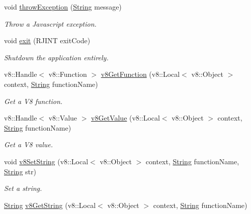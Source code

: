 \begin{DoxyCompactItemize}
void \mbox{\hyperlink{class_rad_j_a_v_1_1_v8_javascript_engine_a08ad9464e2efe78b0c84d32728b12632}{throw\+Exception}} (\mbox{\hyperlink{class_rad_j_a_v_1_1_string}{String}} message)
\begin{DoxyCompactList}\small\item\em Throw a Javascript exception. \end{DoxyCompactList}\item 
void \mbox{\hyperlink{class_rad_j_a_v_1_1_v8_javascript_engine_a23fcc70cb6805867951748fd1c9706f1}{exit}} (R\+J\+I\+NT exit\+Code)
\begin{DoxyCompactList}\small\item\em Shutdown the application entirely. \end{DoxyCompactList}\item 
v8\+::\+Handle$<$ v8\+::\+Function $>$ \mbox{\hyperlink{class_rad_j_a_v_1_1_v8_javascript_engine_a4470255c90c9b8b56a287a2078feefe3}{v8\+Get\+Function}} (v8\+::\+Local$<$ v8\+::\+Object $>$ context, \mbox{\hyperlink{class_rad_j_a_v_1_1_string}{String}} function\+Name)
\begin{DoxyCompactList}\small\item\em Get a V8 function. \end{DoxyCompactList}\item 
v8\+::\+Handle$<$ v8\+::\+Value $>$ \mbox{\hyperlink{class_rad_j_a_v_1_1_v8_javascript_engine_a3e1e2a736c2fbddc4365cafa94615833}{v8\+Get\+Value}} (v8\+::\+Local$<$ v8\+::\+Object $>$ context, \mbox{\hyperlink{class_rad_j_a_v_1_1_string}{String}} function\+Name)
\begin{DoxyCompactList}\small\item\em Get a V8 value. \end{DoxyCompactList}\item 
void \mbox{\hyperlink{class_rad_j_a_v_1_1_v8_javascript_engine_abe037103f725ff0bd14fdc07ec1d82c8}{v8\+Set\+String}} (v8\+::\+Local$<$ v8\+::\+Object $>$ context, \mbox{\hyperlink{class_rad_j_a_v_1_1_string}{String}} function\+Name, \mbox{\hyperlink{class_rad_j_a_v_1_1_string}{String}} str)
\begin{DoxyCompactList}\small\item\em Set a string. \end{DoxyCompactList}\item 
\mbox{\hyperlink{class_rad_j_a_v_1_1_string}{String}} \mbox{\hyperlink{class_rad_j_a_v_1_1_v8_javascript_engine_a7a92772c801855c5af4dd2afb5dbadca}{v8\+Get\+String}} (v8\+::\+Local$<$ v8\+::\+Object $>$ context, \mbox{\hyperlink{class_rad_j_a_v_1_1_string}{String}} function\+Name)

\end{DoxyCompactItemize}
